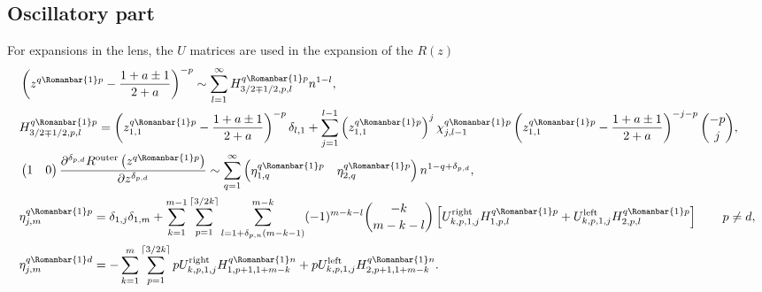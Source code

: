 \documentclass[11pt]{article}
\newcommand{\R}{{\operatorname{right}}}
\renewcommand{\L}{{\operatorname{left}}}
\renewcommand{\O}{{\operatorname{outer}}}
\newcommand{\qg}{q}
\newcommand{\rb}{{\scriptsize \Romanbar{1}} }
\newcommand{\pg}{p}
\newcommand{\pn}{n}
\newcommand{\pd}{d}
\newcommand{\ps}{s}
\numberwithin{equation}{section}
\begin{document}
\subsection{Oscillatory part}

For expansions in the lens, the $U$ matrices are used in the expansion of the $R(z)$
\begin{align}
	& \left(z^{\qg\rb\pg} -\frac{1+a \pm 1}{2+a}\right)^{-p}  \sim \sum_{l=1}^\infty H_{3/2 \mp 1/2,p,l}^{\qg\rb\pg} n^{1-l}, \\
	& H_{3/2 \mp 1/2,p,l}^{\qg\rb\pg} = \left(z_{1,1}^{\qg\rb\pg} -\frac{1+a \pm 1}{2+a}\right)^{-p} \delta_{l,1} + \sum_{j=1}^{l-1} \left(z_{1,1}^{\qg\rb\pg}\right)^{j} \chi_{j,l-1}^{\qg\rb\pg} \left(z_{1,1}^{\qg\rb\pg} -\frac{1+a \pm 1}{2+a}\right)^{-j-p} {-p \choose j}, \\
	& \begin{pmatrix} 1 & 0 \end{pmatrix} \frac{\partial^{\delta_{\pg,\pd}} R^{\O}\left(z^{\qg\rb\pg} \right) }{\partial z^{\delta_{\pg,\pd}} } \sim \sum_{q=1}^\infty \begin{pmatrix} \eta_{1,q}^{\qg\rb\pg} & \eta_{2,q}^{\qg\rb\pg} \end{pmatrix} n^{1-q + \delta_{\pg,\pd} }, \\ %
	& \eta_{j,m}^{\qg\rb\pg} = \delta_{1,j}\delta_{1,m} + \sum_{k=1}^{m-1} \sum_{p=1}^{\lceil 3/2 k \rceil } \sum_{l=1+\delta_{\pg,\pn}\left(m-k-1\right)}^{m-k} (-1)^{m-k-l}  {-k \choose m-k-l} \left[ U_{k,p,1,j}^{\R} H_{1,p,l}^{\qg\rb\pg}  + U_{k,p,1,j}^{\L} H_{2,p,l}^{\qg\rb\pg} \right] \qquad \pg \neq \pd, \\ %
	& \eta_{j,m}^{\qg\rb\pd} = - \sum_{k=1}^{m} \sum_{p=1}^{\lceil 3/2 k \rceil } p U_{k,p,1,j}^{\R} H_{1,p+1,1+m-k}^{\qg\rb\pn}  + p U_{k,p,1,j}^{\L} H_{2,p+1,1+m-k}^{\qg\rb\pn}. %
\end{align}
\end{document}
